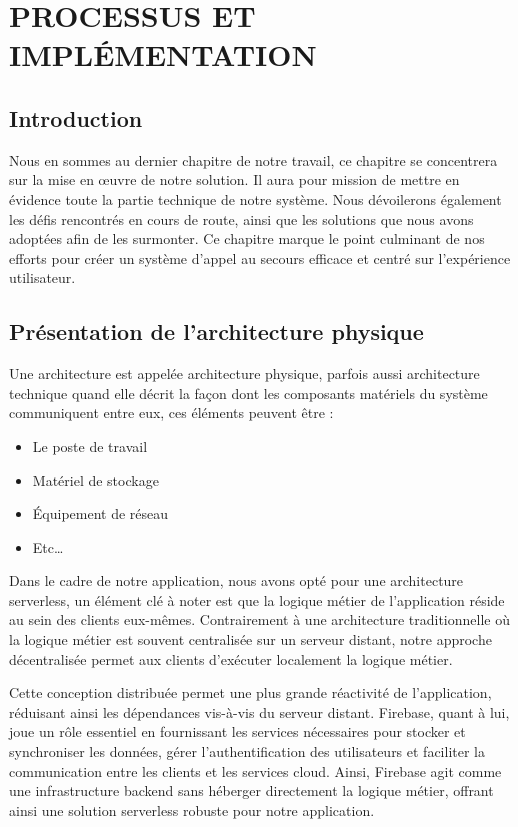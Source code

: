 \chapter{PROCESSUS ET IMPLÉMENTATION}
\justifying
\large
\setlength{\parindent}{2.5em}

\section{Introduction}
Nous en sommes au dernier chapitre de notre travail, ce chapitre se concentrera sur la mise en œuvre de notre solution. Il aura pour mission de mettre en évidence toute la partie technique de notre système. Nous dévoilerons également les défis rencontrés en cours de route, ainsi que les solutions que nous avons adoptées afin de les surmonter. Ce chapitre marque le point culminant de nos efforts pour créer un système d'appel au secours efficace et centré sur l'expérience utilisateur.

\section{Présentation de l'architecture physique}
Une architecture est appelée architecture physique, parfois aussi architecture technique quand elle décrit la façon dont les composants matériels du système communiquent entre eux, ces éléments peuvent être : 

\begin{itemize}
	\item Le poste de travail
	\item Matériel de stockage
	\item Équipement de réseau
	\item Etc…
\end{itemize}

Dans le cadre de notre application, nous avons opté pour une architecture serverless, un élément clé à noter est que la logique métier de l'application réside au sein des clients eux-mêmes. Contrairement à une architecture traditionnelle où la logique métier est souvent centralisée sur un serveur distant, notre approche décentralisée permet aux clients d'exécuter localement la logique métier. 

Cette conception distribuée permet une plus grande réactivité de l'application, réduisant ainsi les dépendances vis-à-vis du serveur distant. Firebase, quant à lui, joue un rôle essentiel en fournissant les services nécessaires pour stocker et synchroniser les données, gérer l'authentification des utilisateurs et faciliter la communication entre les clients et les services cloud. Ainsi, Firebase agit comme une infrastructure backend sans héberger directement la logique métier, offrant ainsi une solution serverless robuste pour notre application.

